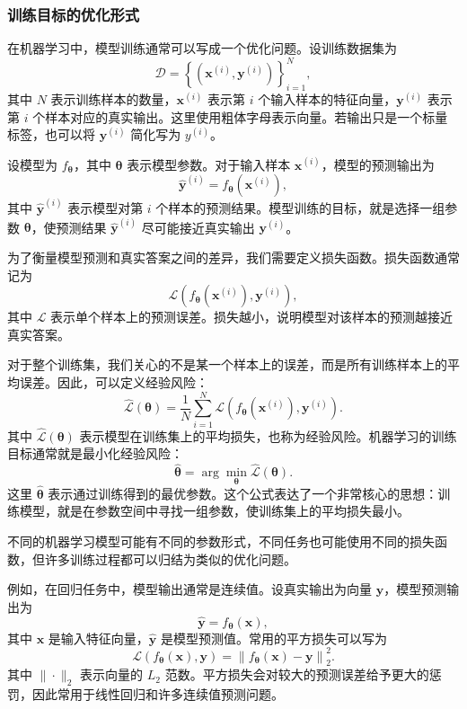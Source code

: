 \subsubsection{训练目标的优化形式}

在机器学习中，模型训练通常可以写成一个优化问题。设训练数据集为
\[
\mathcal{D}
=
\left\{
(\mathbf{x}^{(i)}, \mathbf{y}^{(i)})
\right\}_{i=1}^{N},
\]
其中 $N$ 表示训练样本的数量，$\mathbf{x}^{(i)}$ 表示第 $i$ 个输入样本的特征向量，$\mathbf{y}^{(i)}$ 表示第 $i$ 个样本对应的真实输出。这里使用粗体字母表示向量。若输出只是一个标量标签，也可以将 $\mathbf{y}^{(i)}$ 简化写为 $y^{(i)}$。

设模型为 $f_{\boldsymbol{\theta}}$，其中 $\boldsymbol{\theta}$ 表示模型参数。对于输入样本 $\mathbf{x}^{(i)}$，模型的预测输出为
\[
\hat{\mathbf{y}}^{(i)}
=
f_{\boldsymbol{\theta}}(\mathbf{x}^{(i)}),
\]
其中 $\hat{\mathbf{y}}^{(i)}$ 表示模型对第 $i$ 个样本的预测结果。模型训练的目标，就是选择一组参数 $\boldsymbol{\theta}$，使预测结果 $\hat{\mathbf{y}}^{(i)}$ 尽可能接近真实输出 $\mathbf{y}^{(i)}$。

为了衡量模型预测和真实答案之间的差异，我们需要定义损失函数。损失函数通常记为
\[
\mathcal{L}
\left(
f_{\boldsymbol{\theta}}(\mathbf{x}^{(i)}),
\mathbf{y}^{(i)}
\right),
\]
其中 $\mathcal{L}$ 表示单个样本上的预测误差。损失越小，说明模型对该样本的预测越接近真实答案。

对于整个训练集，我们关心的不是某一个样本上的误差，而是所有训练样本上的平均误差。因此，可以定义经验风险：
\[
\hat{\mathcal{L}}(\boldsymbol{\theta})
=
\frac{1}{N}
\sum_{i=1}^{N}
\mathcal{L}
\left(
f_{\boldsymbol{\theta}}(\mathbf{x}^{(i)}),
\mathbf{y}^{(i)}
\right).
\]
其中 $\hat{\mathcal{L}}(\boldsymbol{\theta})$ 表示模型在训练集上的平均损失，也称为经验风险。机器学习的训练目标通常就是最小化经验风险：
\[
\hat{\boldsymbol{\theta}}
=
\arg\min_{\boldsymbol{\theta}}
\hat{\mathcal{L}}(\boldsymbol{\theta}).
\]
这里 $\hat{\boldsymbol{\theta}}$ 表示通过训练得到的最优参数。这个公式表达了一个非常核心的思想：训练模型，就是在参数空间中寻找一组参数，使训练集上的平均损失最小。

不同的机器学习模型可能有不同的参数形式，不同任务也可能使用不同的损失函数，但许多训练过程都可以归结为类似的优化问题。

例如，在回归任务中，模型输出通常是连续值。设真实输出为向量 $\mathbf{y}$，模型预测输出为
\[
\hat{\mathbf{y}}
=
f_{\boldsymbol{\theta}}(\mathbf{x}),
\]
其中 $\mathbf{x}$ 是输入特征向量，$\hat{\mathbf{y}}$ 是模型预测值。常用的平方损失可以写为
\[
\mathcal{L}
\left(
f_{\boldsymbol{\theta}}(\mathbf{x}),
\mathbf{y}
\right)
=
\left\|
f_{\boldsymbol{\theta}}(\mathbf{x})
-
\mathbf{y}
\right\|_2^2.
\]
其中 $\|\cdot\|_2$ 表示向量的 $L_2$ 范数。平方损失会对较大的预测误差给予更大的惩罚，因此常用于线性回归和许多连续值预测问题。

